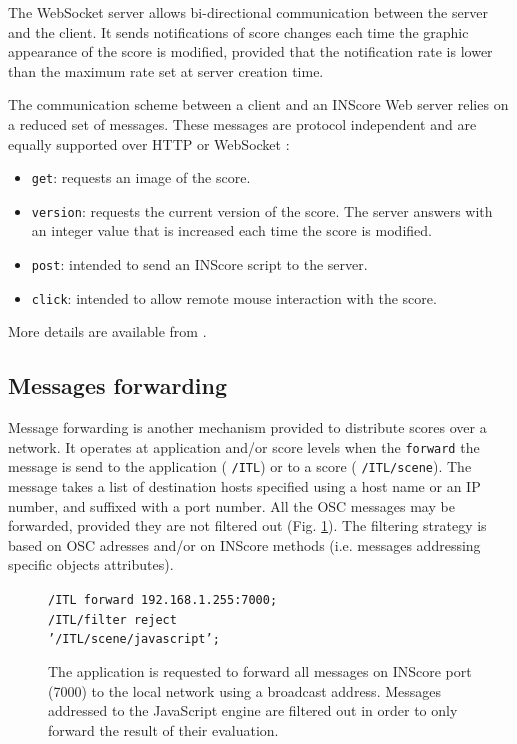 \documentclass[11pt,a4paper]{article}
\newcommand{\OSC}[1]	{{\fontsize{10pt}{10pt} \selectfont\texttt{#1}}}
\newcommand{\tab}		{\hspace*{4mm}}
\newcommand{\dtab}		{\tab \tab}
\newcommand{\sample}[1]	{\vspace{-0.2em}\begin{center}\colorbox{mygrey}{\begin{minipage}[t]{0.98\columnwidth} {\small \texttt{#1}}\end{minipage}}\end{center}}
\begin{document}
The WebSocket server allows bi-directional communication between the server and the client. It sends notifications of score changes each time the graphic appearance of the score is modified, provided that the notification rate is lower than the maximum rate set at server creation time. 

The communication scheme between a client and an INScore Web server relies on a reduced set of messages. These messages are protocol independent and are equally supported over HTTP or WebSocket :
\begin{itemize}
\item \OSC{get}: requests an image of the score.
\item \OSC{version}: requests the current version of the score. The server answers with an integer value that is increased each time the score is modified.
\item \OSC{post}: intended to send an INScore script to the server.  
\item \OSC{click}: intended to allow remote mouse interaction with the score.
\end{itemize}

More details are available from \cite{Fober:15b}.


\subsection{Messages forwarding}\label{forward}

Message forwarding is another mechanism provided to distribute scores over a network. It operates at application and/or score levels when the \OSC{forward} the message is send to the application (\OSC{/ITL}) or to a score (\OSC{/ITL/scene}). 
The message takes a list of destination hosts specified using a host name or an IP number, and suffixed with a port number. All the OSC messages may be forwarded, provided they are not filtered out (Fig. \ref{fig:forward}).
The filtering strategy is based on OSC adresses and/or on INScore methods (i.e. messages addressing specific objects attributes). 
\begin{figure}[h]
\begin{center}
\sample{/ITL forward 192.168.1.255:7000; \\
/ITL/filter reject \\
\dtab'/ITL/scene/javascript';
}
\caption{The application is requested to forward all messages on INScore port (7000) to the local network using a broadcast address. Messages addressed to the JavaScript engine are filtered out in order to only forward the result of their evaluation.}
\label{fig:forward}
\end{center}
\end{figure}
\end{document}
